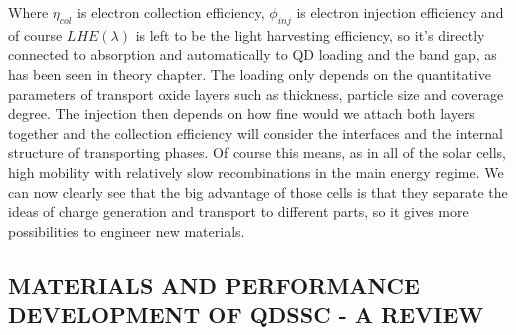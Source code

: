 Where $\eta_{col}$ is electron collection efficiency, $\phi_{inj}$ is electron injection efficiency and of course $LHE(\lambda )$ is left to be the light harvesting efficiency, so it's directly connected to absorption and automatically to QD loading and the band gap, as has been seen in theory chapter. The loading only depends on the quantitative parameters of transport oxide layers such as thickness, particle size and coverage degree. The injection then depends on how fine would we attach both layers together and the collection efficiency will consider the interfaces and the internal structure of transporting phases. Of course this means, as in all of the solar cells, high mobility with relatively slow recombinations in the main energy regime. We can now clearly see that the big advantage of those cells is that they separate the ideas of charge generation and transport to different parts, so it gives more possibilities to engineer new materials. 
\cite{HuashangRao2018} \cite{Wu2014}

\subsection{MATERIALS AND PERFORMANCE DEVELOPMENT OF QDSSC - A REVIEW}

